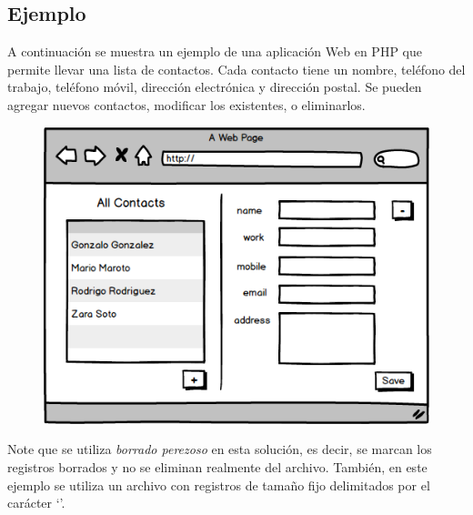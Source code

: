 \documentclass[a5paper,10pt,spanish]{sphinxmanual}
\begin{document}
\subsection{Ejemplo}
\label{Tutorial4_Archivos.md:ejemplo}
A continuación se muestra un ejemplo de una aplicación Web en PHP que
permite llevar una lista de contactos. Cada contacto tiene un nombre,
teléfono del trabajo, teléfono móvil, dirección electrónica y dirección
postal. Se pueden agregar nuevos contactos, modificar los existentes, o
eliminarlos.
\begin{figure}[htbp]
\centering

\includegraphics{Agenda.png}
\end{figure}

Note que se utiliza \emph{borrado perezoso} en esta solución, es decir, se
marcan los registros borrados y no se eliminan realmente del archivo.
También, en este ejemplo se utiliza un archivo con registros de tamaño
fijo delimitados por el carácter `\textbar{}'.
\end{document}
